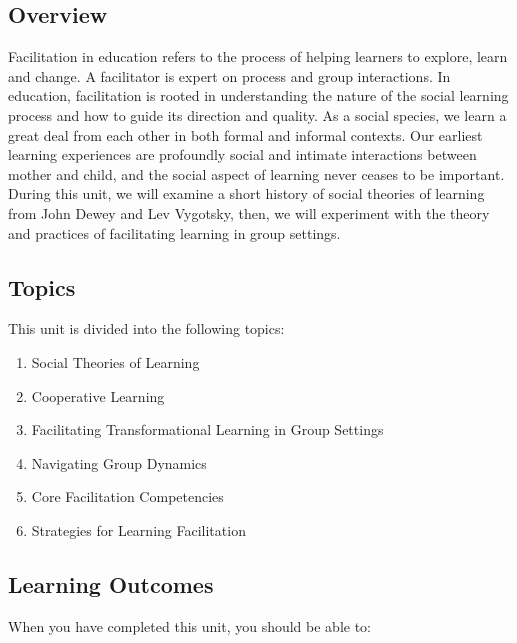 \documentclass[
]{book}
\providecommand{\tightlist}{%
  \setlength{\itemsep}{0pt}\setlength{\parskip}{0pt}}
\begin{document}
\hypertarget{overview-1}{%
\subsection*{Overview}\label{overview-1}}

Facilitation in education refers to the process of helping learners to explore, learn and change. A facilitator is expert on process and group interactions. In education, facilitation is rooted in understanding the nature of the social learning process and how to guide its direction and quality. As a social species, we learn a great deal from each other in both formal and informal contexts. Our earliest learning experiences are profoundly social and intimate interactions between mother and child, and the social aspect of learning never ceases to be important. During this unit, we will examine a short history of social theories of learning from John Dewey and Lev Vygotsky, then, we will experiment with the theory and practices of facilitating learning in group settings.

\hypertarget{topics-1}{%
\subsection*{Topics}\label{topics-1}}

This unit is divided into the following topics:

\begin{enumerate}
\def\labelenumi{\arabic{enumi}.}
\tightlist
\item
  Social Theories of Learning
\item
  Cooperative Learning
\item
  Facilitating Transformational Learning in Group Settings
\item
  Navigating Group Dynamics
\item
  Core Facilitation Competencies
\item
  Strategies for Learning Facilitation
\end{enumerate}

\hypertarget{learning-outcomes-1}{%
\subsection*{Learning Outcomes}\label{learning-outcomes-1}}

When you have completed this unit, you should be able to:
\end{document}
